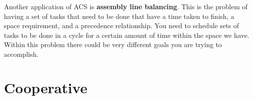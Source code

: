 \documentclass[12pt]{article}
\begin{document}
Another application of ACS is \textbf{assembly line balancing}. This is the problem of having a set of tasks that need to be done that have a time taken to finish, a space requirement, and a precedence relationship. You need to schedule sets of tasks to be done in a cycle for a certain amount of time within the space we have. Within this problem there could be very different goals you are trying to accomplish.




\section{Cooperative} %
\label{sec:cooperative}

\end{document}
